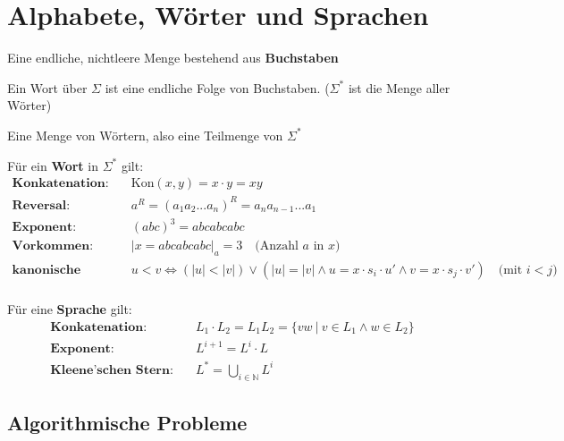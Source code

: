 \documentclass[11pt]{article}
\begin{document}
\section{Alphabete, W{\"o}rter und Sprachen}

\begin{description}[labelindent=16pt,style=multiline,leftmargin=5cm, noitemsep]
	\item[Alphabet $\Sigma$:] Eine endliche, nichtleere Menge bestehend aus \textbf{Buchstaben}
	\item[Wort:] Ein Wort {\"u}ber $\Sigma$ ist eine endliche Folge von Buchstaben. ($\Sigma^*$ ist die Menge aller W{\"o}rter)
	\item[Sprache $L$:] Eine Menge von W{\"o}rtern, also eine Teilmenge von $\Sigma^*$
\end{description}

F{\"u}r ein \textbf{Wort} in $\Sigma^*$ gilt:
\begin{equation*}
\begin{split}
	\textbf{Konkatenation:}\quad & \text{Kon}(x,y) = x \cdot y = xy \\
	\textbf{Reversal:} \quad & a^R = (a_1a_2...a_n)^R = a_na_{n-1}...a_1 \\
	\textbf{Exponent:} \quad & (abc)^3 = abcabcabc \\
	\textbf{Vorkommen:} \quad & |x = abcabcabc|_a = 3\quad\text{(Anzahl $a$ in $x$)} \\
	\textbf{kanonische Ordnung:} \quad & u < v \Leftrightarrow (|u| < |v|) \lor (|u| = |v| \land u = x \cdot s_i \cdot u' \land v = x \cdot s_j \cdot v') \quad\text{(mit $i < j$)} \\
\end{split}
\end{equation*}

F{\"u}r eine \textbf{Sprache} gilt:
\begin{equation*}
\begin{split}
	\textbf{Konkatenation:}\quad & L_1\cdot L_2 = L_1L_2 = \{vw\ |\ v \in L_1 \land w \in L_2\} \\
	\textbf{Exponent:}\quad & L^{i+1} = L^i\cdot L \\
	\textbf{Kleene'schen Stern:}\quad & L^* = \bigcup_{i\in\mathbb{N}}L^i
\end{split}
\end{equation*}

\subsection{Algorithmische Probleme}
\end{document}
